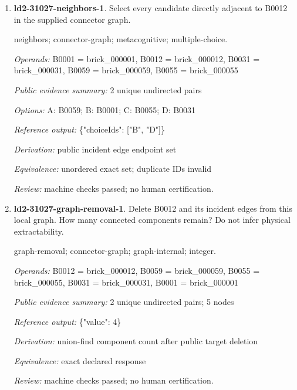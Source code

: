 \begin{enumerate}
\par{\small interface; connector-graph; metacognitive; single-choice.\par\textit{Operands:} B0060 = brick\_000060, B0061 = brick\_000061\par\textit{Public evidence summary:} \{"connectorRecord": \{"family": "stud", "aConnector": 1, "bConnector": 3\}, "scope": "Upstream connector tolerances and inset mesh intersections; unknown parts remain explicit, separate scene objects are not glued together; no load/force validation."\}\par\textit{Options:} A: fixed; B: hinge; C: ball; D: stud; E: axle\par\textit{Reference output:} \{"choiceId": "D"\}\par\textit{Derivation:} public connectorRecord.family equality\par\textit{Equivalence:} exact declared response\par\textit{Review:} machine checks passed; no human certification.}
\item \textbf{ld2-31027-neighbors-1}. Select every candidate directly adjacent to B0012 in the supplied connector graph.
\par{\small neighbors; connector-graph; metacognitive; multiple-choice.\par\textit{Operands:} B0001 = brick\_000001, B0012 = brick\_000012, B0031 = brick\_000031, B0059 = brick\_000059, B0055 = brick\_000055\par\textit{Public evidence summary:} 2 unique undirected pairs\par\textit{Options:} A: B0059; B: B0001; C: B0055; D: B0031\par\textit{Reference output:} \{"choiceIds": ["B", "D"]\}\par\textit{Derivation:} public incident edge endpoint set\par\textit{Equivalence:} unordered exact set; duplicate IDs invalid\par\textit{Review:} machine checks passed; no human certification.}
\item \textbf{ld2-31027-graph-removal-1}. Delete B0012 and its incident edges from this local graph. How many connected components remain? Do not infer physical extractability.
\par{\small graph-removal; connector-graph; graph-internal; integer.\par\textit{Operands:} B0012 = brick\_000012, B0059 = brick\_000059, B0055 = brick\_000055, B0031 = brick\_000031, B0001 = brick\_000001\par\textit{Public evidence summary:} 2 unique undirected pairs; 5 nodes\par\textit{Reference output:} \{"value": 4\}\par\textit{Derivation:} union-find component count after public target deletion\par\textit{Equivalence:} exact declared response\par\textit{Review:} machine checks passed; no human certification.}

\end{enumerate}
